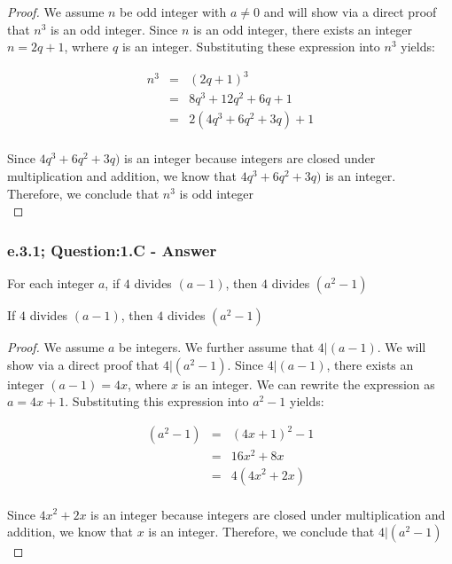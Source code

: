 \begin{proof}
We assume $n$ be odd integer with $a \neq 0$ and will show via a direct proof that $n^3$ is an odd integer. 
Since $n$ is an odd integer, there exists an integer $n = 2q +1$, wrhere $q$ is an integer. Substituting these expression into $n^3$ yields:

\begin{eqnarray*}
	n^3 & = & (2q + 1)^3 \nonumber \\	
	& = & 8q^3 + 12q^2 + 6q + 1 \nonumber \\
	& = & 2(4q^3 + 6q^2 + 3q) + 1 \nonumber \\
\end{eqnarray*}

Since $4q^3 + 6q^2 + 3q)$ is an integer because integers are closed under multiplication and addition, we know that $4q^3 + 6q^2 + 3q)$ is an integer. Therefore, we conclude that $n^3$ is odd integer \\
\end{proof}

\subsubsection*{e.3.1; Question:1.C - Answer}
For each integer $a$, if $4$ divides $(a - 1)$, then $4$ divides $(a^2 - 1)$

\begin{tcolorbox}
	\begin{theorem}
		If $4$ divides $(a - 1)$, then $4$ divides $(a^2 - 1)$
	\end{theorem}
\end{tcolorbox}

\begin{proof}
We assume $a$ be integers. We further assume that $4 | (a-1)$. We will show via a direct proof that $4 | (a^2 - 1)$. Since $4 | (a - 1)$, there exists an integer $(a-1) = 4x$, where $x$ is an integer. We can rewrite the expression as $a = 4x + 1$. Substituting this expression into $a^2 -1$ yields:

\begin{eqnarray*}
	(a^2 - 1) & = & (4x + 1)^2 - 1 \nonumber \\	
	& = & 16x^2 + 8x \nonumber \\
	& = & 4(4x^2 + 2x) \nonumber \\	
\end{eqnarray*}

Since $4x^2 + 2x$ is an integer because integers are closed under multiplication and addition, we know that $x$ is an integer. Therefore, we conclude that $4 | (a^2 - 1)$ \\
\end{proof}




